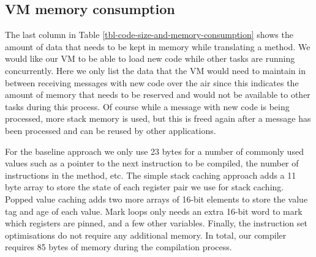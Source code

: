 \subsection{VM memory consumption} The last column in Table \ref{tbl-code-size-and-memory-consumption} shows the amount of data that needs to be kept in memory while translating a method. We would like our VM to be able to load new code while other tasks are running concurrently. Here we only list the data that the VM would need to maintain in between receiving messages with new code over the air since this indicates the amount of memory that needs to be reserved and would not be available to other tasks during this process. Of course while a message with new code is being processed, more stack memory is used, but this is freed again after a message has been processed and can be reused by other applications.

For the baseline approach we only use 23 bytes for a number of commonly used values such as a pointer to the next instruction to be compiled, the number of instructions in the method, etc. The simple stack caching approach adds a 11 byte array to store the state of each register pair we use for stack caching. Popped value caching adds two more arrays of 16-bit elements to store the value tag and age of each value. Mark loops only needs an extra 16-bit word to mark which registers are pinned, and a few other variables. Finally, the instruction set optimisations do not require any additional memory. In total, our compiler requires 85 bytes of memory during the compilation process.


